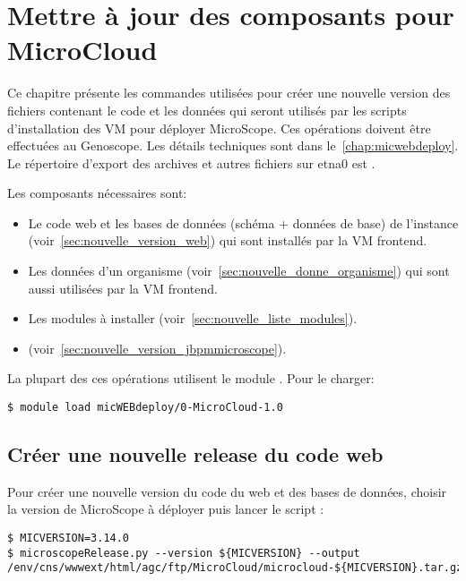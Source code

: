 \chapter{Mettre à jour des composants pour MicroCloud} \label{chap:creer_nouvelle_version}

Ce chapitre présente les commandes utilisées pour créer une nouvelle version
des fichiers contenant le code et les données qui seront utilisés
par les scripts d'installation des VM pour déployer MicroScope.
Ces opérations doivent être effectuées au Genoscope.
Les détails techniques sont dans le~\autoref{chap:micwebdeploy}.
Le répertoire d'export des archives et autres fichiers sur etna0 est .

Les composants nécessaires sont:
\begin{itemize}
    \item Le code web et les bases de données (schéma + données de base) de l'instance (voir~\autoref{sec:nouvelle_version_web})
          qui sont installés par la VM frontend.
    \item Les données d'un organisme (voir~\autoref{sec:nouvelle_donne_organisme})
          qui sont aussi utilisées par la VM frontend.
    \item Les modules à installer (voir~\autoref{sec:nouvelle_liste_modules}).
    \item {} (voir~\autoref{sec:nouvelle_version_jbpmmicroscope}).
\end{itemize}

La plupart des ces opérations utilisent le module \micWEBdeployVer.
Pour le charger:
\begin{lstlisting}[style=bash]
$ module load micWEBdeploy/0-MicroCloud-1.0
\end{lstlisting}

\section{Créer une nouvelle release du code web} \label{sec:nouvelle_version_web}

Pour créer une nouvelle version du code du web et des bases de données, choisir la version de MicroScope à déployer puis lancer le script  :
\begin{lstlisting}[style=bash]
$ MICVERSION=3.14.0
$ microscopeRelease.py --version ${MICVERSION} --output /env/cns/wwwext/html/agc/ftp/MicroCloud/microcloud-${MICVERSION}.tar.gz
\end{lstlisting}

